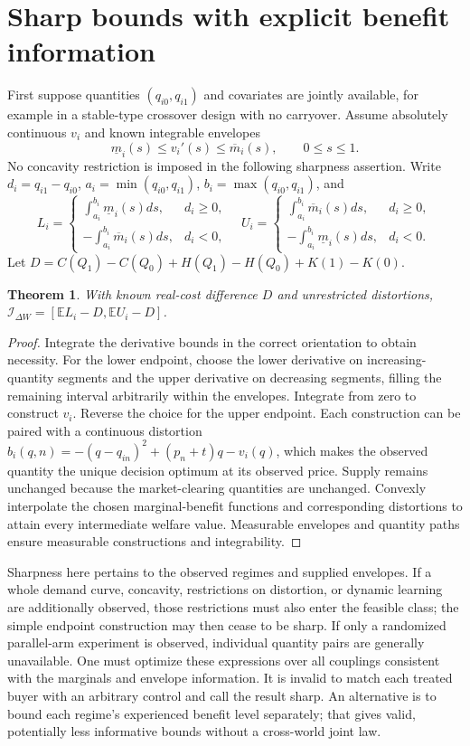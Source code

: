 \documentclass[11pt]{article}
\newtheorem{theorem}{Theorem}
\theoremstyle{definition}
\newcommand{\E}{\mathbb E}
\begin{document}
\section*{Sharp bounds with explicit benefit information}
First suppose quantities $(q_{i0},q_{i1})$ and covariates are jointly available,
for example in a stable-type crossover design with no carryover. Assume
absolutely continuous $v_i$ and known integrable envelopes
\[
 \underline m_i(s)\le v_i'(s)\le\overline m_i(s),\qquad 0\le s\le1.
\]
No concavity restriction is imposed in the following sharpness assertion.
Write $d_i=q_{i1}-q_{i0}$, $a_i=\min(q_{i0},q_{i1})$,
$b_i=\max(q_{i0},q_{i1})$, and
\[
 L_i=\begin{cases}\int_{a_i}^{b_i}\underline m_i(s)ds,&d_i\ge0,\\
 -\int_{a_i}^{b_i}\overline m_i(s)ds,&d_i<0,\end{cases}
 \quad
 U_i=\begin{cases}\int_{a_i}^{b_i}\overline m_i(s)ds,&d_i\ge0,\\
 -\int_{a_i}^{b_i}\underline m_i(s)ds,&d_i<0.\end{cases}
\]
Let $D=C(Q_1)-C(Q_0)+H(Q_1)-H(Q_0)+K(1)-K(0)$.
\begin{theorem}
With known real-cost difference $D$ and unrestricted distortions,
$\mathcal I_{\Delta W}=[\E L_i-D,\E U_i-D]$.
\end{theorem}
\begin{proof}
Integrate the derivative bounds in the correct orientation to obtain necessity.
For the lower endpoint, choose the lower derivative on increasing-quantity
segments and the upper derivative on decreasing segments, filling the remaining
interval arbitrarily within the envelopes. Integrate from zero to construct
$v_i$. Reverse the choice for the upper endpoint. Each construction can be
paired with a continuous distortion
$b_i(q,n)=- (q-q_{in})^2+(p_n+t)q-v_i(q)$, which makes the observed quantity the
unique decision optimum at its observed price. Supply remains unchanged because
the market-clearing quantities are unchanged. Convexly interpolate the chosen
marginal-benefit functions and corresponding distortions to attain every
intermediate welfare value. Measurable envelopes and quantity paths ensure
measurable constructions and integrability.
\end{proof}
Sharpness here pertains to the observed regimes and supplied envelopes. If a
whole demand curve, concavity, restrictions on distortion, or dynamic learning
are additionally observed, those restrictions must also enter the feasible
class; the simple endpoint construction may then cease to be sharp.
If only a randomized parallel-arm experiment is observed, individual quantity
pairs are generally unavailable. One must optimize these expressions over all
couplings consistent with the marginals and envelope information. It is invalid
to match each treated buyer with an arbitrary control and call the result sharp.
An alternative is to bound each regime's experienced benefit level separately;
that gives valid, potentially less informative bounds without a cross-world joint law.
\end{document}
